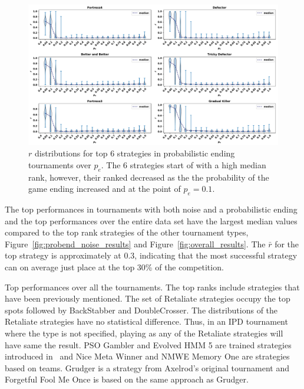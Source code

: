 \documentclass{article}
\begin{document}
\begin{figure}[!htbp]
    \centering
    \includegraphics[width=.92\textwidth]{../images/folk_theorem.pdf}
    \caption{\(r\) distributions for top 6 strategies in probabilistic ending tournaments
    over $p_e$. The 6 strategies start of with a high median rank,
    however, their ranked decreased as the the probability of the game ending
    increased and at the point of \(p_e = 0.1\).}
    \label{fig:effect_of_probend}
\end{figure}

The top performances in tournaments with both noise and a probabilistic ending
and the top performances over the entire data set have the largest median values
compared to the top rank strategies of the other tournament types,
Figure~\ref{fig:probend_noise_results} and Figure~\ref{fig:overall_results}. The
\(\bar{r}\) for the top strategy is approximately at 0.3, indicating that the
most successful strategy can on average just place at the top 30\% of the
competition.

\begin{table}[!htbp]
    \centering
    \resizebox{.30\textwidth}{!}{
    }
    \caption{Top performances over all the tournaments. The top ranks include
    strategies that have been previously mentioned. The set of Retaliate
    strategies occupy the top spots followed by BackStabber and DoubleCrosser.
    The distributions of the Retaliate strategies have no statistical
    difference. Thus, in an IPD tournament where the type is not specified,
    playing as any of the Retaliate strategies will have same the result. PSO
    Gambler and Evolved HMM 5 are trained strategies introduced
    in~\cite{Harper2017} and Nice Meta Winner and NMWE Memory One are strategies
    based on teams. Grudger is a strategy from Axelrod's original tournament and
    Forgetful Fool Me Once is based on the same approach as
    Grudger.}\label{table:overall_results}
\end{table}
\end{document}
